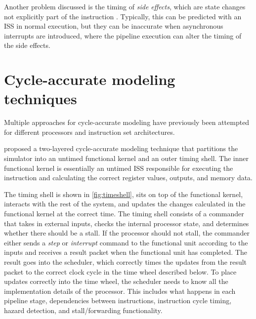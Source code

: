 Another problem discussed is the timing of \textit{side effects}, which are state changes not explicitly part of the instruction \cite{taylorAdvancedRISCVVerification2023}. Typically, this can be predicted with an ISS in normal execution, but they can be inaccurate when asynchronous interrupts are introduced, where the pipeline execution can alter the timing of the side effects.










\section{Cycle-accurate modeling techniques}
\label{sec:bg_cycle-accurate}

Multiple approaches for cycle-accurate modeling have previously been attempted for different processors and instruction set architectures.

\textcite{chiangEfficientTwolayeredCycleaccurate2009} proposed a two-layered cycle-accurate modeling technique that partitions the simulator into an untimed functional kernel and an outer timing shell. The inner functional kernel is essentially an untimed ISS responsible for executing the instruction and calculating the correct register values, outputs, and memory data.

The timing shell is shown in \cref{fig:timeshell}, sits on top of the functional kernel, interacts with the rest of the system, and updates the changes calculated in the functional kernel at the correct time. The timing shell consists of a commander that takes in external inputs, checks the internal processor state, and determines whether there should be a stall. If the processor should not stall, the commander either sends a \textit{step} or \textit{interrupt} command to the functional unit according to the inputs and receives a result packet when the functional unit has completed. The result goes into the scheduler, which correctly times the updates from the result packet to the correct clock cycle in the time wheel described below. To place updates correctly into the time wheel, the scheduler needs to know all the implementation details of the processor. This includes what happens in each pipeline stage, dependencies between instructions, instruction cycle timing, hazard detection, and stall/forwarding functionality. 

